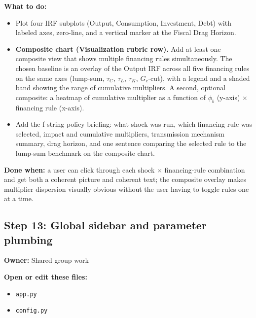 \documentclass[11pt]{article}
\begin{document}
\textbf{What to do:}
\begin{itemize}
    \item Plot four IRF subplots (Output, Consumption, Investment, Debt) with labeled axes, zero-line, and a vertical marker at the Fiscal Drag Horizon.
    \item \textbf{Composite chart (Visualization rubric row).} Add at least one composite view that shows multiple financing rules simultaneously. The chosen baseline is an overlay of the Output IRF across all five financing rules on the same axes (lump-sum, $\tau_C$, $\tau_L$, $\tau_K$, $G_c$-cut), with a legend and a shaded band showing the range of cumulative multipliers. A second, optional composite: a heatmap of cumulative multiplier as a function of $\phi_b$ (y-axis) $\times$ financing rule (x-axis).
    \item Add the f-string policy briefing: what shock was run, which financing rule was selected, impact and cumulative multipliers, transmission mechanism summary, drag horizon, and one sentence comparing the selected rule to the lump-sum benchmark on the composite chart.
\end{itemize}

\textbf{Done when:} a user can click through each shock $\times$ financing-rule combination and get both a coherent picture and coherent text; the composite overlay makes multiplier dispersion visually obvious without the user having to toggle rules one at a time.

\subsection{Step 13: Global sidebar and parameter plumbing}
\textbf{Owner:} Shared group work

\textbf{Open or edit these files:}
\begin{itemize}
    \item \texttt{app.py}
    \item \texttt{config.py}
\end{itemize}
\end{document}
